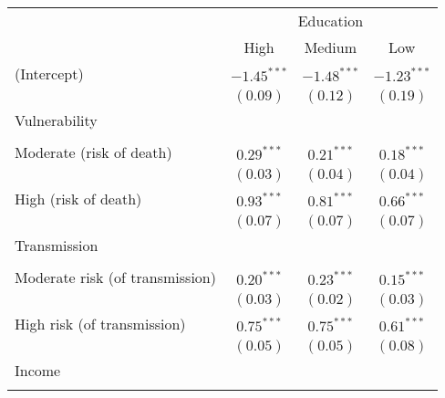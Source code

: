 
\begin{table}
\begin{center}
\begin{scriptsize}
\begin{tabular}{l c c c}
\hline
 & \multicolumn{3}{c}{Education} \\
\cline{2-4}
 & High & Medium & Low \\
\hline
(Intercept)                                     & $-1.45^{***}$ & $-1.48^{***}$ & $-1.23^{***}$ \\
                                                & $(0.09)$      & $(0.12)$      & $(0.19)$      \\
Vulnerability                                   &               &               &               \\
                                                &               &               &               \\
\quad Moderate (risk of death)                  & $0.29^{***}$  & $0.21^{***}$  & $0.18^{***}$  \\
                                                & $(0.03)$      & $(0.04)$      & $(0.04)$      \\
\quad High (risk of death)                      & $0.93^{***}$  & $0.81^{***}$  & $0.66^{***}$  \\
                                                & $(0.07)$      & $(0.07)$      & $(0.07)$      \\
Transmission                                    &               &               &               \\
                                                &               &               &               \\
\quad Moderate risk (of transmission)           & $0.20^{***}$  & $0.23^{***}$  & $0.15^{***}$  \\
                                                & $(0.03)$      & $(0.02)$      & $(0.03)$      \\
\quad High risk (of transmission)               & $0.75^{***}$  & $0.75^{***}$  & $0.61^{***}$  \\
                                                & $(0.05)$      & $(0.05)$      & $(0.08)$      \\
Income                                          &               &               &               \\
                                                &               &               &               \\

\end{tabular}
\end{scriptsize}
\end{center}
\end{table}
